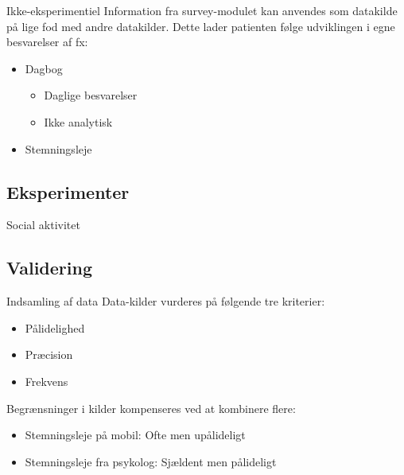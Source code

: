 \begin{frame}{Ikke-eksperimentiel}
Information fra survey-modulet kan anvendes som datakilde på lige fod med andre datakilder.
Dette lader patienten følge udviklingen i egne besvarelser af fx:
\begin{itemize}
\item Dagbog
\begin{itemize}
\item Daglige besvarelser
\item Ikke analytisk
\end{itemize}
\item Stemningsleje\\
\mygraph{\gstem{}}
\end{itemize}
\end{frame}

\subsection{Eksperimenter}

\begin{frame}{Social aktivitet}
\end{frame}

\subsection{Validering}
\begin{frame}{Indsamling af data}
Data-kilder vurderes på følgende tre kriterier:
\begin{itemize}
\item Pålidelighed
\item Præcision
\item Frekvens
\end{itemize}
Begrænsninger i kilder kompenseres ved at kombinere flere:
\begin{itemize}
\item Stemningsleje på mobil: Ofte men upålideligt
\item Stemningsleje fra psykolog: Sjældent men pålideligt
\end{itemize}
\end{frame}

